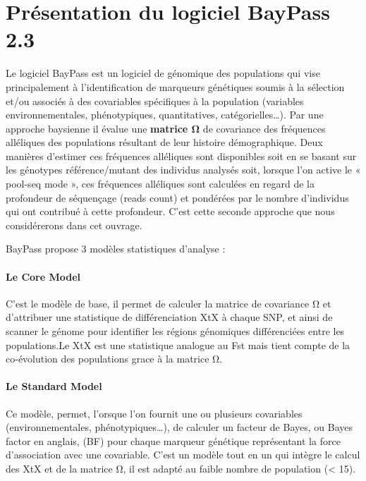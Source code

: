 \documentclass[
  openany]{book}
\theoremstyle{definition}
\theoremstyle{definition}
\theoremstyle{definition}
\theoremstyle{definition}
\theoremstyle{remark}
\begin{document}
\hypertarget{pruxe9sentation-du-logiciel-baypass-2.3}{%
\chapter*{Présentation du logiciel BayPass 2.3}\label{pruxe9sentation-du-logiciel-baypass-2.3}}

Le logiciel BayPass est un logiciel de génomique des populations qui vise principalement à l'identification de marqueurs génétiques soumis à la sélection et/ou associés à des covariables spécifiques à la population (variables environnementales, phénotypiques, quantitatives, catégorielles\ldots). Par une approche baysienne il évalue une \textbf{matrice Ω} de covariance des fréquences alléliques des populations résultant de leur histoire démographique. Deux manières d'estimer ces fréquences alléliques sont disponibles soit en se basant sur les génotypes référence/mutant des individus analysés soit, lorsque l'on active le « pool-seq mode », ces fréquences alléliques sont calculées en regard de la profondeur de séquençage (reads count) et pondérées par le nombre d'individus qui ont contribué à cette profondeur. C'est cette seconde approche que nous considérerons dans cet ouvrage.

BayPass propose 3 modèles statistiques d'analyse :

\hypertarget{le-core-model}{%
\subsubsection*{Le Core Model}\label{le-core-model}}

C'est le modèle de base, il permet de calculer la matrice de covariance Ω et d'attribuer une statistique de différenciation XtX à chaque SNP, et ainsi de scanner le génome pour identifier les régions génomiques différenciées entre les populations.Le XtX est une statistique analogue au Fst mais tient compte de la co-évolution des populations grace à la matrice Ω.

\hypertarget{le-standard-model}{%
\subsubsection*{Le Standard Model}\label{le-standard-model}}

Ce modèle, permet, l'orsque l'on fournit une ou plusieurs covariables (environnementales, phénotypiques\ldots), de calculer un facteur de Bayes, ou Bayes factor en anglais, (BF) pour chaque marqueur génétique représentant la force d'association avec une covariable. C'est un modèle tout en un qui intègre le calcul des XtX et de la matrice Ω, il est adapté au faible nombre de population (\textless{} 15).
\end{document}
